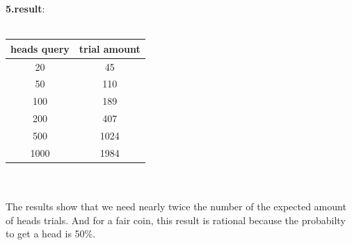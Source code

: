 \documentclass[twoside]{article}
\begin{document}
\textbf{5.result}:\\ \\ 
\begin{tabular}{|| c | c ||}
 \hline \hline
 heads query & trial amount \\ \hline \hline
20 & 45 \\ \hline
50 & 110 \\ \hline
100 & 189 \\ \hline
200 & 407 \\ \hline
500 & 1024 \\ \hline
1000 & 1984 \\ \hline
\end{tabular}
\\ \\
The results show that we need nearly twice the number of the expected amount of heads trials. And for a fair coin, this result is rational because the probabilty to get a head is 50\%.
\end{document}
